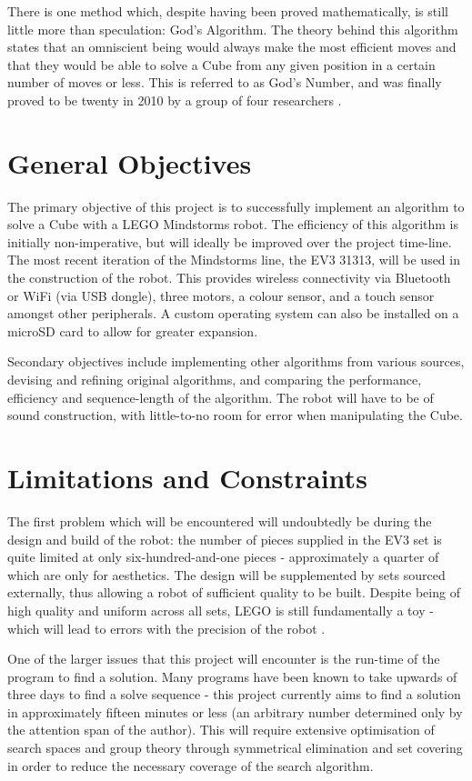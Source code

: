 \documentclass{report}
\newcommand{\lego}{LEGO }
\begin{document}
    There is one method which, despite having been proved mathematically, is still little more than speculation: God's Algorithm. The theory behind this algorithm states that an omniscient being would always make the most efficient moves and that they would be able to solve a Cube from any given position in a certain number of moves or less. This is referred to as God's Number, and was finally proved to be twenty in 2010 by a group of four researchers \cite{Rokicki2010}.
    
    \section{General Objectives}
    The primary objective of this project is to successfully implement an algorithm to solve a Cube with a \lego Mindstorms robot. The efficiency of this algorithm is initially non-imperative, but will ideally be improved over the project time-line. The most recent iteration of the Mindstorms line, the EV3 31313, will be used in the construction of the robot. This provides wireless connectivity via Bluetooth or WiFi (via USB dongle), three motors, a colour sensor, and a touch sensor amongst other peripherals. A custom operating system can also be installed on a microSD card to allow for greater expansion.
    
    Secondary objectives include implementing other algorithms from various sources, devising and refining original algorithms, and comparing the performance, efficiency and sequence-length of the algorithm. The robot will have to be of sound construction, with little-to-no room for error when manipulating the Cube.
    
    \section{Limitations and Constraints}
    The first problem which will be encountered will undoubtedly be during the design and build of the robot: the number of pieces supplied in the EV3 set is quite limited at only six-hundred-and-one pieces - approximately a quarter of which are only for aesthetics. The design will be supplemented by sets sourced externally, thus allowing a robot of sufficient quality to be built. Despite being of high quality and uniform across all sets, \lego is still fundamentally a toy - which will lead to errors with the precision of the robot \cite{Cook2017}.
    
    One of the larger issues that this project will encounter is the run-time of the program to find a solution. Many programs have been known to take upwards of three days to find a solve sequence - this project currently aims to find a solution in approximately fifteen minutes or less (an arbitrary number determined only by the attention span of the author). This will require extensive optimisation of search spaces and group theory through symmetrical elimination and set covering in order to reduce the necessary coverage of the search algorithm.
    
\end{document}
